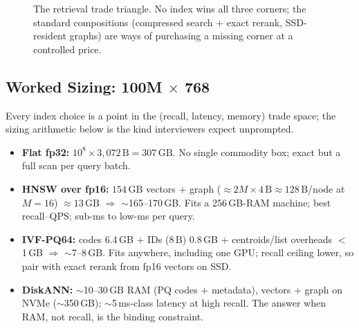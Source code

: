 \begin{figure}[H]
\centering
{}
\caption{The retrieval trade triangle. No index wins all three corners; the standard compositions (compressed search $+$ exact rerank, SSD-resident graphs) are ways of purchasing a missing corner at a controlled price.}
\label{sr:fig:vr_triangle}
\end{figure}

\subsection{Worked Sizing: 100M $\times$ 768}

Every index choice is a point in the (recall, latency, memory) trade space; the sizing arithmetic below is the kind interviewers expect unprompted.

\begin{itemize}
    \item \textbf{Flat fp32:} $10^8 \times 3{,}072\,\mathrm{B} = 307\,\mathrm{GB}$. No single commodity box; exact but a full scan per query batch.
    \item \textbf{HNSW over fp16:} $154\,\mathrm{GB}$ vectors $+$ graph ($\approx 2M \times 4\,\mathrm{B} \approx 128\,\mathrm{B}$/node at $M{=}16$) $\approx 13\,\mathrm{GB}$ $\Rightarrow$ $\sim$165--170\,GB. Fits a 256\,GB-RAM machine; best recall--QPS; sub-ms to low-ms per query.
    \item \textbf{IVF-PQ64:} codes 6.4\,GB $+$ IDs ($8\,\mathrm{B}$) 0.8\,GB $+$ centroids/list overheads $<$1\,GB $\Rightarrow$ $\sim$7--8\,GB. Fits anywhere, including one GPU; recall ceiling lower, so pair with exact rerank from fp16 vectors on SSD.
    \item \textbf{DiskANN:} $\sim$10--30\,GB RAM (PQ codes $+$ metadata), vectors $+$ graph on NVMe ($\sim$350\,GB); $\sim$5\,ms-class latency at high recall. The answer when RAM, not recall, is the binding constraint.
\end{itemize}

